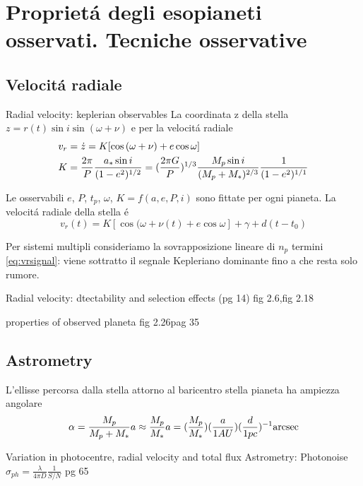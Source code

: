 \chapter{Propriet\'a degli esopianeti osservati. Tecniche osservative}

\section{Velocit\'a radiale}
\begin{workout}{Radial velocity: keplerian observables}
La coordinata z della stella $z=r(t)\sin{i}\sin{(\omega+\nu)}$ e per la velocit\'a radiale
\begin{align}
&v_r=\dot{z}=K[\cos{(\omega+\nu)}+e\cos{\omega}]\label{eq:vrsignal}\\
&K=\frac{2\pi}{P}\frac{a_*\sin{i}}{(1-e^2)\expy{1/2}}=(\frac{2\pi G}{P})\expy{1/3}\frac{M_p\sin{i}}{(M_p+M_*)\expy{2/3}}\frac{1}{(1-e^2)\expy{1/1}}
\end{align}

Le osservabili $e$, $P$, $t_p$, $\omega$, $K=f(a,e,P,i)$ sono fittate per ogni pianeta.
La velocit\'a radiale della stella \'e
\begin{equation}
v_r(t)=K[\cos{(\omega+\nu(t)}+e\cos{\omega}]+\gamma+d(t-t_0)
\end{equation}
\end{workout}
Per sistemi multipli consideriamo la sovrapposizione lineare di $n_p$ termini \eqref{eq:vrsignal}: viene sottratto il segnale Kepleriano dominante fino a che resta solo rumore.
\begin{workout}{Radial velocity: dtectability and selection effects (pg 14)}
fig 2.6,fig 2.18
\end{workout}
\begin{workout}{properties of observed planeta}
fig 2.26pag 35
\end{workout}
\section{Astrometry}
L'ellisse percorsa dalla stella attorno al baricentro stella pianeta ha ampiezza angolare
\begin{equation}
\alpha=\frac{M_p}{M_p+M_*}a\approx\frac{M_p}{M_*}a=(\frac{M_p}{M_*})(\frac{a}{1AU})(\frac{d}{1pc})\expy{-1}\si{\arcsec}
\end{equation}

\begin{workout}{Variation in photocentre, radial velocity and total flux}
Astrometry: Photonoise $\sigma_{ph}=\frac{\lambda}{4\pi D}\frac{1}{S/N}$
pg 65
\end{workout}

